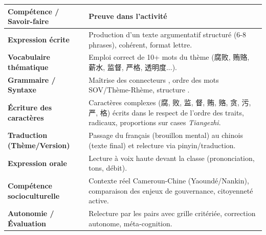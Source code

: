 \documentclass[11pt]{article}
\newcommand{\zh}[1]{\ifmmode\text{#1}\else{#1}\fi}
\begin{document}
\begin{aretenir}
\begin{center}
\begin{tabularx}{\linewidth}{|X|X|}
\hline
\rowcolor{poppurpleL} \textbf{Compétence / Savoir-faire} & \textbf{Preuve dans l'activité} \\ \hline
\textbf{Expression écrite} & Production d'un texte argumentatif structuré (6-8 phrases), cohérent, format lettre. \\ \hline
\textbf{Vocabulaire thématique} & Emploi correct de 10+ mots du thème (腐败, 贿赂, 薪水, 监督, 严格, 透明度...). \\ \hline
\textbf{Grammaire / Syntaxe} & Maîtrise des connecteurs \zh{首先/其次/为了/应该}, ordre des mots SOV/Thème-Rhème, structure \zh{不够+Adj}. \\ \hline
\textbf{Écriture des caractères} & Caractères complexes (腐, 败, 监, 督, 贿, 赂, 贪, 污, 严, 格) écrits dans le respect de l'ordre des traits, radicaux, proportions sur cases \emph{Tiangezhi}. \\ \hline
\textbf{Traduction (Thème/Version)} & Passage du français (brouillon mental) au chinois (texte final) et relecture via pinyin/traduction. \\ \hline
\textbf{Expression orale} & Lecture à voix haute devant la classe (prononciation, tons, débit). \\ \hline
\textbf{Compétence socioculturelle} & Contexte réel Cameroun-Chine (Yaoundé/Nankin), comparaison des enjeux de gouvernance, citoyenneté active. \\ \hline
\textbf{Autonomie / Évaluation} & Relecture par les pairs avec grille critériée, correction autonome, méta-cognition. \\ \hline
\end{tabularx}
\end{center}

\end{aretenir}
\end{document}
